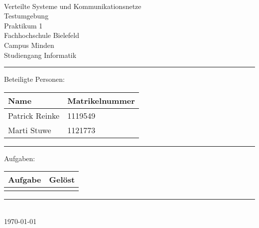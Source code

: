 


\begin{titlepage}
   \mbox{}\vspace{5\baselineskip}\\
   \sffamily\huge
   \centering
   {\Huge Verteilte Systeme und Kommunikationsnetze} \\
  Testumgebung \\ \normalsize Praktikum  1
   \vspace{3\baselineskip}\\
   \rmfamily\Large
  Fachhochschule Bielefeld \\
  Campus Minden \\
  Studiengang Informatik
   \vspace{2\baselineskip}\\
\noindent\rule{15cm}{0.4pt}
Beteiligte Personen:
\begin{table}[H]
	\tablestyle
	\begin{tabular}{*{2}{v{0.45\textwidth}}}
		\hline
		\textbf{Name} &
		\textbf{Matrikelnummer} \tabularnewline
		\hline
		Patrick Reinke  & 1119549 \tabularnewline
		Marti Stuwe  & 1121773 \tabularnewline
	\end{tabular}
\end{table}

\centering
\noindent\rule{15cm}{0.4pt}
{\Large Aufgaben:}
\begin{table}[H]
	\tablestyle
	\begin{tabular}{*{2}{v{0.45\textwidth}}}
		\hline
		\textbf{Aufgabe} &
		\textbf{Gelöst} \tabularnewline
		\hline
		 \tabularnewline

		
	\end{tabular}
\end{table}
   \noindent\rule{15cm}{0.4pt}
      \vspace{1\baselineskip}\\
   \today
\end{titlepage}

